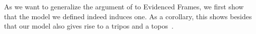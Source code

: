 \documentclass[a4paper,UKenglish,cleveref, autoref, thm-restate]{lipics-v2021}
\begin{document}

As we want to generalize the argument of  to Evidenced Frames,
we first show that the model we defined indeed induces one. As a corollary,
this shows besides that our model also gives rise to a tripos and a topos~\cite{CohMiqTat21}.
\end{document}
